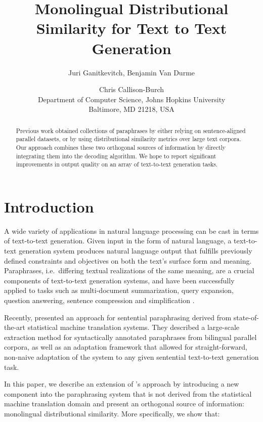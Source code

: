 \documentclass[11pt]{article}
\author{Juri Ganitkevitch, Benjamin Van Durme \and
  Chris Callison-Burch \\
  Department of Computer Science, Johns Hopkins University \\
  Baltimore, MD 21218, USA}
\title{Monolingual Distributional Similarity for Text to Text Generation}
\begin{document}
\maketitle

\begin{abstract}
  Previous work obtained collections of paraphrases by either relying
  on sentence-aligned parallel datasets, or by using distributional
  similarity metrics over large text corpora. Our approach combines
  these two orthogonal sources of information by directly integrating
  them into the decoding algorithm. We hope to report significant
  improvements in output quality on an array of text-to-text
  generation tasks.
\end{abstract}

\section{Introduction}

A wide variety of applications in natural language processing can be
cast in terms of text-to-text generation. Given input in the form of
natural language, a text-to-text generation system produces natural
language output that fulfills previously defined constraints and
objectives on both the text's surface form and meaning. Paraphrases,
i.e.\ differing textual realizations of the same meaning, are a
crucial components of text-to-text generation systems, and have been
successfully applied to tasks such as multi-document summarization,
query expansion, question answering, sentence compression and
simplification
\cite{Barzilay1999,BarzilayThesis,mckeown:1979:ACL,Anick1999,Ravichandran2002,Riezler2007}.

Recently,  presented an approach for
sentential paraphrasing derived from state-of-the-art statistical
machine translation systems. They described a large-scale extraction
method for syntactically annotated paraphrases from bilingual parallel
corpora, as well as an adaptation framework that allowed for
straight-forward, non-naive adaptation of the system to any given
sentential text-to-text generation task.

In this paper, we describe an extension of
's approach by introducing a new component
into the paraphrasing system that is not derived from the statistical
machine translation domain and present an orthogonal source of
information: monolingual distributional similarity. More specifically,
we show that:
\end{document}
